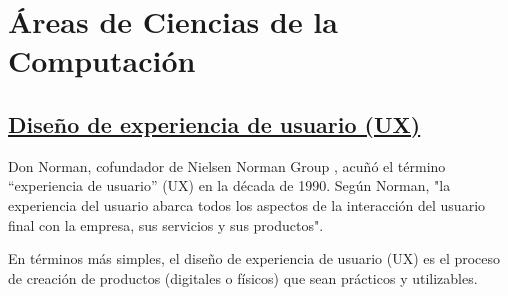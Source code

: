 \documentclass[10pt,conference]{IEEEtran}
\begin{document}
\section{\textbf{Áreas de Ciencias de la Computación}} 

\subsection{\underline{\textbf{Diseño de experiencia de usuario (UX)}}}
Don Norman, cofundador de Nielsen Norman Group , acuñó el término “experiencia de usuario” (UX) en la década de 1990. Según Norman, "la experiencia del usuario abarca todos los aspectos de la interacción del usuario final con la empresa, sus servicios y sus productos".

En términos más simples, el diseño de experiencia de usuario (UX) es el proceso de creación de productos (digitales o físicos) que sean prácticos y utilizables. \citep{expe}
\end{document}
